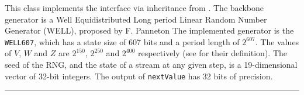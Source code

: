 
This class implements the  interface via inheritance
from . The backbone generator is a Well
Equidistributed Long period Linear Random Number Generator (WELL),
proposed by F. Panneton
The implemented generator is the \texttt{WELL607}, which has a state
size of 607 bits
and a period length of 
\latex{$\rho\approx$} $2^{607}$. The values of $V$, $W$ and $Z$ are $2^{150}$,
$2^{250}$ and $2^{400}$ respectively (see  for their
definition). The seed of the RNG, and the state of a stream at any given
step, is a 19-dimensional vector of 32-bit integers.
The output of \texttt{nextValue} has 32 bits of precision.


\bigskip\hrule


